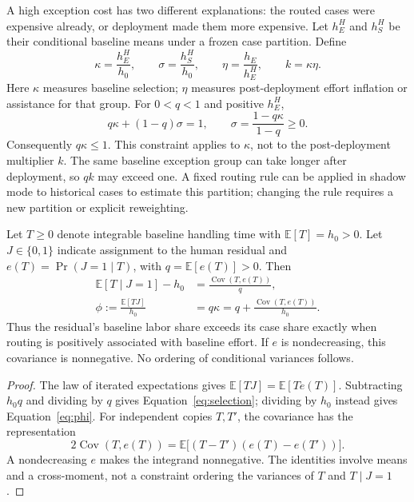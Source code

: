 A high exception cost has two different explanations: the routed cases were expensive already, or
deployment made them more expensive. Let $h_E^H$ and $h_S^H$ be their conditional baseline means
under a frozen case partition. Define
\begin{equation}
\kappa = \frac{h_E^H}{h_0}, \qquad \sigma = \frac{h_S^H}{h_0}, \qquad
\eta = \frac{h_E}{h_E^H}, \qquad k = \kappa\eta. \label{eq:ratios}
\end{equation}
Here $\kappa$ measures baseline selection; $\eta$ measures post-deployment effort inflation or
assistance for that group. For $0<q<1$ and positive $h_E^H$,
\begin{equation}
q\kappa + (1-q)\sigma = 1, \qquad \sigma = \frac{1-q\kappa}{1-q}\ge 0. \label{eq:partition}
\end{equation}
Consequently $q\kappa\le 1$. This constraint applies to $\kappa$, not to the post-deployment
multiplier $k$. The same baseline exception group can take longer after deployment, so $qk$ may
exceed one. A fixed routing rule can be applied in shadow mode to historical cases to estimate this
partition; changing the rule requires a new partition or explicit reweighting.

\begin{proposition}
\label{prop:selection}
Let $T\ge 0$ denote integrable baseline handling time with $\mathbb{E}[T]=h_0>0$. Let
$J\in\{0,1\}$ indicate assignment to the human residual and $e(T)=\Pr(J=1\mid T)$, with
$q=\mathbb{E}[e(T)]>0$. Then
\begin{align}
\mathbb{E}[T\mid J=1]-h_0 &= \frac{\operatorname{Cov}(T,e(T))}{q}, \label{eq:selection}\\
\phi := \frac{\mathbb{E}[TJ]}{h_0} &= q\kappa = q+\frac{\operatorname{Cov}(T,e(T))}{h_0}. \label{eq:phi}
\end{align}
Thus the residual's baseline labor share exceeds its case share exactly when routing is positively
associated with baseline effort. If $e$ is nondecreasing, this covariance is nonnegative. No ordering
of conditional variances follows.
\end{proposition}

\begin{proof}
The law of iterated expectations gives $\mathbb{E}[TJ]=\mathbb{E}[Te(T)]$. Subtracting $h_0q$ and
dividing by $q$ gives Equation~\eqref{eq:selection}; dividing by $h_0$ instead gives
Equation~\eqref{eq:phi}. For independent copies $T,T'$, the covariance has the representation
\[
2\operatorname{Cov}(T,e(T)) = \mathbb{E}\bigl[(T-T')(e(T)-e(T'))\bigr].
\]
A nondecreasing $e$ makes the integrand nonnegative. The identities involve means and a
cross-moment, not a constraint ordering the variances of $T$ and $T\mid J=1$.
\end{proof}

